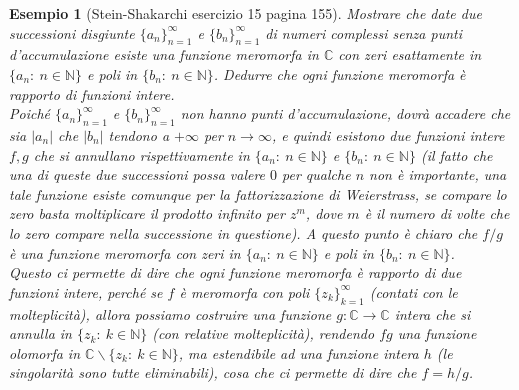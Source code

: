 \documentclass[11pt]{book}
\theoremstyle{Definizione}
\theoremstyle{TeoremaProposizioneLemmaCorollarioCongettura}
\theoremstyle{OsservazioneNotaEsempio}
\newtheorem{myes}{Esempio}[section]
\newcommand{\N}{\mathbb{N}}
\newcommand{\C}{\mathbb{C}}
\newcommand{\tolto}{\smallsetminus}
\begin{document}
\begin{myes}[Stein-Shakarchi esercizio 15 pagina 155]\label{es:SteinShakarchiEs15pag155}
Mostrare che date due successioni disgiunte $\{a_n\}_{n = 1}^\infty$ e $\{b_n\}_{n = 1}^\infty$ di numeri complessi senza punti d'accumulazione esiste una funzione meromorfa in $\C$ con zeri esattamente in $\{a_n:\ n\in \N\}$ e poli in $\{b_n:\ n\in \N\}$. Dedurre che ogni funzione meromorfa è rapporto di funzioni intere.\\
Poiché $\{a_n\}_{n = 1}^\infty$ e $\{b_n\}_{n = 1}^\infty$ non hanno punti d'accumulazione, dovrà accadere che sia $|a_n|$ che $|b_n|$ tendono a $+\infty$ per $n\to \infty$, e quindi esistono due funzioni intere $f,g$ che si annullano rispettivamente in $\{a_n:\ n\in \N\}$ e $\{b_n:\ n\in \N\}$ (il fatto che una di queste due successioni possa valere $0$ per qualche $n$ non è importante, una tale funzione esiste comunque per la fattorizzazione di Weierstrass, se compare lo zero basta moltiplicare il prodotto infinito per $z^m$, dove $m$ è il numero di volte che lo zero compare nella successione in questione). A questo punto è chiaro che $f/g$ è una funzione meromorfa con zeri in $\{a_n:\ n\in \N\}$ e poli in $\{b_n:\ n\in \N\}$.\\
Questo ci permette di dire che ogni funzione meromorfa è rapporto di due funzioni intere, perché se $f$ è meromorfa con poli $\{z_k\}_{k = 1}^\infty$ (contati con le molteplicità), allora possiamo costruire una funzione $g:\C\longrightarrow \C$ intera che si annulla in $\{z_k:\ k\in \N\}$ (con relative molteplicità), rendendo $fg$ una funzione olomorfa in $\C\tolto \{z_k:\ k\in \N\}$, ma estendibile ad una funzione intera $h$ (le singolarità sono tutte eliminabili), cosa che ci permette di dire che $f = h/g$.
\end{myes}
\end{document}
